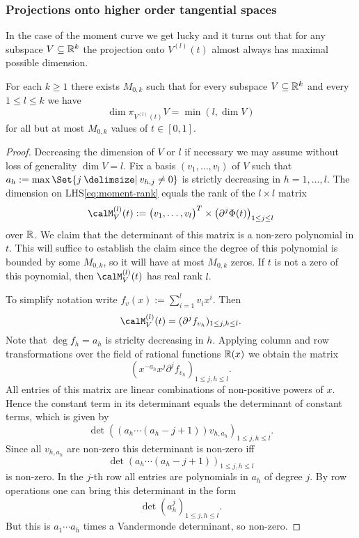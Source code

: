\subsubsection{Projections onto higher order tangential spaces}
In the case of the moment curve we get lucky and it turns out that for any subspace $V \subseteq \mathbb{R}^{k}$ the projection onto $V^{(l)}(t)$ almost always has maximal possible dimension.
\begin{theorem}
\label{thm:moment-rank}
For each $k\ge 1$ there exists $M_{0,k}$ such that for every subspace $V \subseteq \mathbb{R}^{k}$ and every $1\leq l\leq k$ we have
\begin{equation}
\label{eq:moment-rank}
\dim \pi_{V^{(l)}(t)} V = \min(l,\dim V)
\end{equation}
for all but at most $M_{0,k}$ values of $t \in [0,1]$.
\end{theorem}
\begin{proof}
Decreasing the dimension of $V$ or $l$ if necessary we may assume without loss of generality $\dim V = l$.
Fix a basis $(v_{1},\dotsc,v_{l})$ of $V$ such that $a_{h} := \max \Set{ j \given v_{h,j} \neq 0 }$ is strictly decreasing in $h=1,\dotsc,l$.
The dimension on LHS\eqref{eq:moment-rank} equals the rank of the $l\times l$ matrix
\begin{equation}
\calM_V^{(l)}(t)
:=
\bigl( v_1, \dotsc, v_{l} \bigr)^T \times \bigl( \partial^{j} \Phi(t) \bigr)_{1 \leq j \leq l}
\end{equation}
over $\mathbb{R}$.
We claim that the determinant of this matrix is a non-zero polynomial in $t$.
This will suffice to establish the claim since the degree of this polynomial is bounded by some $M_{0,k}$, so it will have at most $M_{0,k}$ zeros.
If $t$ is not a zero of this poynomial, then $\calM_{V}^{(l)}(t)$ has real rank $l$.

To simplify notation write $f_{v}(x) := \sum_{i=1}^{l} v_{i}x^{i}$.
Then
\[
\calM_V^{(l)}(t) = ( \partial^{j} f_{v_h} )_{1 \leq j,h \leq l}.
\]
Note that $\deg f_{h} = a_{h}$ is striclty decreasing in $h$.
Applying column and row transformations over the field of rational functions $\mathbb{R}(x)$ we obtain the matrix
\[
( x^{-a_{h}} x^{j} \partial^{j} f_{v_h} )_{1 \leq j,h \leq l}.
\]
All entries of this matrix are linear combinations of non-positive powers of $x$.
Hence the constant term in its determinant equals the determinant of constant terms, which is given by
\[
\det ( (a_{h} \dotsm (a_{h}-j+1)) v_{h,a_{h}} )_{1 \leq j,h \leq l}.
\]
Since all $v_{h,a_{h}}$ are non-zero this determinant is non-zero iff
\[
\det ( a_{h} \dotsm (a_{h}-j+1) )_{1 \leq j,h \leq l}
\]
is non-zero.
In the $j$-th row all entries are polynomials in $a_{h}$ of degree $j$.
By row operations one can bring this determinant in the form
\[
\det ( a_{h}^{j} )_{1 \leq j,h \leq l}.
\]
But this is $a_{1}\dotsm a_{h}$ times a Vandermonde determinant, so non-zero.
\end{proof}



